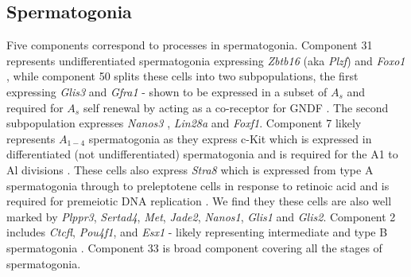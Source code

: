 \subsection{Spermatogonia}


Five components correspond to processes in spermatogonia. Component 31 represents undifferentiated spermatogonia expressing \textit{Zbtb16} (aka \textit{Plzf}) \parencite{Buaas2004Plzf} and \textit{Foxo1} \parencite{Goertz2011Foxo1}, while component 50 splits these cells into two subpopulations, the first expressing \textit{Glis3} \parencite{Kang2016Transcription} and \textit{Gfra1} - shown to be expressed in a subset of $A_s$ and required for $A_s$ self renewal by acting as a co-receptor for GNDF \parencite{Meng2000Regulation,He2007Gfra1}. The second subpopulation expresses \textit{Nanos3} \parencite{Suzuki2009heterogeneity}, \textit{Lin28a} \parencite{Zheng2009pluripotency} and \textit{Foxf1}. Component 7 likely represents $A_{1-4}$ spermatogonia as they express c-Kit which is expressed in differentiated (not undifferentiated) spermatogonia \parencite{Manova1990Gonadal,Schrans-Stassen1999Differential} and is required for the A1 to Al divisions \parencite{Yoshinaga1991Role}. These cells also express \textit{Stra8} which is expressed from type A spermatogonia through to preleptotene cells in response to retinoic acid \parencite{Oulad-Abdelghani1996Characterization,Zhou2008Expression,Endo2015Periodic} and is required for premeiotic DNA replication \parencite{Baltus2006germ}. We find they these cells are also well marked by \textit{Plppr3}, \textit{Sertad4}, \textit{Met}, \textit{Jade2}, \textit{Nanos1}, \textit{Glis1} and \textit{Glis2}. Component 2 includes \textit{Ctcfl}, \textit{Pou4f1}, and \textit{Esx1} - likely representing intermediate and type B spermatogonia \parencite{Sleutels2012male, Budhram-Mahadeo2001closely, Maezawa2018Dynamic, Li1997Esx1, Branford1997Spx1}. Component 33 is broad component covering all the stages of spermatogonia.


